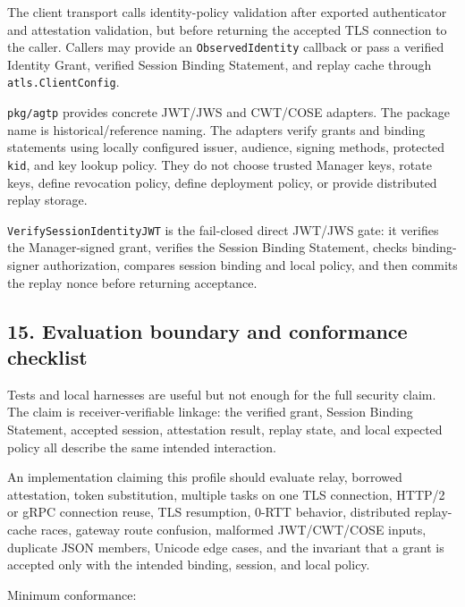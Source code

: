 \documentclass[
]{article}
\begin{document}
The client transport calls identity-policy validation after exported
authenticator and attestation validation, but before returning the
accepted TLS connection to the caller. Callers may provide an
\texttt{ObservedIdentity} callback or pass a verified Identity Grant,
verified Session Binding Statement, and replay cache through
\texttt{atls.ClientConfig}.

\texttt{pkg/agtp} provides concrete JWT/JWS and CWT/COSE adapters. The
package name is historical/reference naming. The adapters verify grants
and binding statements using locally configured issuer, audience,
signing methods, protected \texttt{kid}, and key lookup policy. They do
not choose trusted Manager keys, rotate keys, define revocation policy,
define deployment policy, or provide distributed replay storage.

\texttt{VerifySessionIdentityJWT} is the fail-closed direct JWT/JWS
gate: it verifies the Manager-signed grant, verifies the Session Binding
Statement, checks binding-signer authorization, compares session binding
and local policy, and then commits the replay nonce before returning
acceptance.

\subsection{15. Evaluation boundary and conformance
checklist}\label{evaluation-boundary-and-conformance-checklist}

Tests and local harnesses are useful but not enough for the full
security claim. The claim is receiver-verifiable linkage: the verified
grant, Session Binding Statement, accepted session, attestation result,
replay state, and local expected policy all describe the same intended
interaction.

An implementation claiming this profile should evaluate relay, borrowed
attestation, token substitution, multiple tasks on one TLS connection,
HTTP/2 or gRPC connection reuse, TLS resumption, 0-RTT behavior,
distributed replay-cache races, gateway route confusion, malformed
JWT/CWT/COSE inputs, duplicate JSON members, Unicode edge cases, and the
invariant that a grant is accepted only with the intended binding,
session, and local policy.

Minimum conformance:
\end{document}
